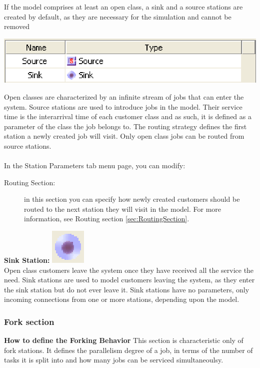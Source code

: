 \begin{enumerate*}
If the model comprises at least an open class, a sink and  a source stations are created by default, as they are necessary for the simulation and cannot be removed\\
\begin{center}
\includegraphics[scale=.5]{img/jsim/source_sink.eps}
\end{center}
Open classes are characterized by an infinite stream of jobs that can enter the system. Source stations are used to introduce jobs in the model. Their service time is the interarrival time of each customer class and as such, it is defined as a parameter of the class the job belongs to. The routing strategy defines the first station
a newly created job will visit. Only open class jobs can be routed from source stations.\\\\
In the Station Parameters tab menu page, you can modify:
\begin{description}
\item[Routing Section:] in this section you can specify how newly created customers should be routed to the next station they will visit in the model.
For more information, see Routing section \ref{sec:RoutingSection}.
\end{description}
\item \textbf{Sink Station:} \includegraphics[scale=1]{img/jsim/sink.eps}\\
Open class customers leave the system once they have received all the service the need. Sink stations are used to model customers leaving the system, as they
enter the sink station but do not ever leave it. Sink stations have no parameters, only incoming connections from one or more stations, depending upon the model.
\end{enumerate*}

\subsubsection{Fork section}
\label{sec:ForkSection}
\textbf{How to define the Forking Behavior}
This section is characteristic only of fork stations. It defines the parallelism degree of a job, in terms of the number of tasks it is split into and how many jobs can be serviced simultaneoulsy.


